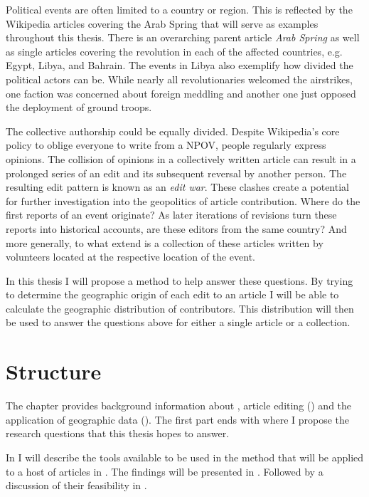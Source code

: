 Political events are often limited to a country or region. 
This is reflected by the Wikipedia articles covering the Arab Spring that will serve as examples throughout this thesis.
There is an overarching parent article \emph{Arab Spring} as well as single articles covering the revolution in each of the affected countries, e.g. Egypt, Libya, and Bahrain.
The events in Libya also exemplify how divided the political actors can be.
While nearly all revolutionaries welcomed the airstrikes, one faction was concerned about foreign meddling and another one just opposed the deployment of ground troops.\cite{econ18290470}

The collective authorship could be equally divided.
Despite Wikipedia's core policy to oblige everyone to write from a \ac{NPOV}, people regularly express opinions. 
The collision of opinions in a collectively written article can result in a prolonged series of an edit and its subsequent reversal by another person. 
The resulting edit pattern is known as an \emph{edit war}.\cite{suh2007us}
These clashes create a potential for further investigation into the geopolitics of article contribution.
Where do the first reports of an event originate?
As later iterations of revisions turn these reports into historical accounts, are these editors from the same country?
And more generally, to what extend is a collection of these articles written by volunteers located at the respective location of the event.

In this thesis I will propose a method to help answer these questions.
By trying to determine the geographic origin of each edit to an article I will be able to calculate the geographic distribution of contributors.
This distribution will then be used to answer the questions above for either a single article or a collection.



\section{Structure}


The chapter  provides background information about , article editing () and the application of geographic data ().
The first part ends with  where I propose the research questions that this thesis hopes to answer.

In  I will describe the tools available to be used in the method that will be applied to a host of articles in .
The findings will be presented in .
Followed by a discussion of their feasibility in .